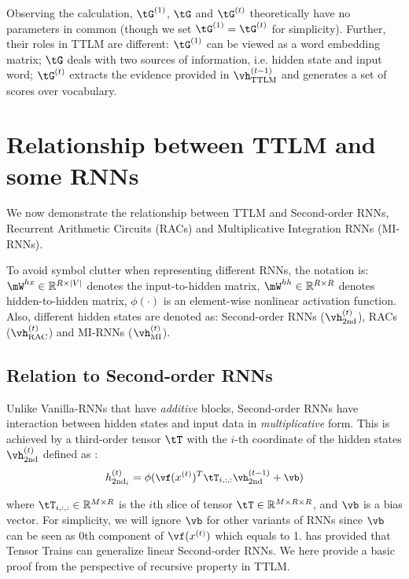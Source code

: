 \documentclass{article}
\theoremstyle{plain}
\theoremstyle{definition}
\theoremstyle{remark}
\begin{document}
Observing the calculation, $\tG^{(1)}$, $\tG$ and $\tG^{(t)}$ theoretically have no parameters in common (though we set $\tG^{(1)} = \tG^{(t)}$ for simplicity). Further, their roles in TTLM are different: $\tG^{(1)}$ can be viewed as a word embedding matrix; $\tG$ deals with two sources of information, i.e. hidden state and input word; $\tG^{(t)}$ extracts the evidence provided in $\vh^{(t-1)}_{\textrm{TTLM}}$ and generates a set of scores over vocabulary. 



\section{Relationship between TTLM and some RNNs}
\label{sec: TTLM generalization}

We now demonstrate the relationship between TTLM and Second-order RNNs,  Recurrent Arithmetic Circuits (RACs) and Multiplicative Integration RNNs (MI-RNNs).  

To avoid symbol clutter when representing  different RNNs, the notation is:  $\mW^{hx} \in \mathbb{R}^{R \times |V|}$ denotes the input-to-hidden  matrix, $\mW^{hh} \in \mathbb{R}^{R \times R}$ denotes hidden-to-hidden  matrix, $\phi(\cdot)$ is an element-wise nonlinear activation function. Also, different hidden states are denoted as: Second-order RNNs ($\vh^{(t)}_\textrm{2nd}$), RACs ($\vh^{(t)}_\textrm{RAC}$) and MI-RNNs ($\vh^{(t)}_\textrm{MI}$).


\subsection{Relation to Second-order RNNs}
\label{appendix: seecond}

Unlike Vanilla-RNNs \citep{mikolov2012context} that have \textit{additive} blocks, Second-order RNNs have interaction between hidden states and input data in \textit{multiplicative} form.   This is achieved by a third-order tensor $\tT$ with the $i$-th coordinate of the hidden states $\vh^{(t)}_\textrm{2nd}$ defined as \citep{hochreiter1997long, maupome-meurs-2020-language}:
%
\begin{equation} \small
\label{eq: second-order-rnn}
h^{(t)}_{\textrm{2nd}_i}  = \phi(\vf(x^{(t)})^T \tT_{i, :, :}\vh^{(t-1)}_\textrm{2nd} + \vb)
\end{equation}
%

where $\tT_{i, :, :} \in\mathbb{R}^{M \times R}$ is the $i$th slice of tensor $\tT\in\mathbb{R}^{M\times R \times R}$, and $\vb$ is a bias vector. For simplicity, we will ignore  $\vb$ for other variants of RNNs since $\vb$  can be seen as $0$th component of $\vf (x^{(t)})$ which equals to 1. \cite{rabusseau2019connecting} has provided that Tensor Trains can  generalize linear Second-order RNNs. We here provide a basic proof from the perspective of recursive property in TTLM.
\end{document}
